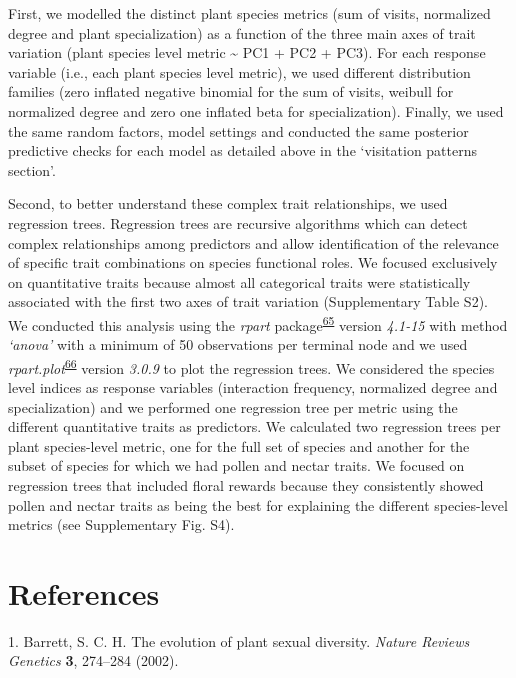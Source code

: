 \documentclass[12pt,a4paper,]{article}
\begin{document}
First, we modelled the distinct plant species metrics (sum of visits,
normalized degree and plant specialization) as a function of the three
main axes of trait variation (plant species level metric
\textasciitilde{} PC1 + PC2 + PC3). For each response variable (i.e.,
each plant species level metric), we used different distribution
families (zero inflated negative binomial for the sum of visits, weibull
for normalized degree and zero one inflated beta for specialization).
Finally, we used the same random factors, model settings and conducted
the same posterior predictive checks for each model as detailed above in
the `visitation patterns section'.

Second, to better understand these complex trait relationships, we used
regression trees. Regression trees are recursive algorithms which can
detect complex relationships among predictors and allow identification
of the relevance of specific trait combinations on species functional
roles. We focused exclusively on quantitative traits because almost all
categorical traits were statistically associated with the first two axes
of trait variation (Supplementary Table S2). We conducted this analysis
using the \emph{rpart}
package\textsuperscript{\protect\hyperlink{ref-therneau2015}{65}}
version \emph{4.1-15} with method \emph{`anova'} with a minimum of 50
observations per terminal node and we used
\emph{rpart.plot}\textsuperscript{\protect\hyperlink{ref-milborrow2015}{66}}
version \emph{3.0.9} to plot the regression trees. We considered the
species level indices as response variables (interaction frequency,
normalized degree and specialization) and we performed one regression
tree per metric using the different quantitative traits as predictors.
We calculated two regression trees per plant species-level metric, one
for the full set of species and another for the subset of species for
which we had pollen and nectar traits. We focused on regression trees
that included floral rewards because they consistently showed pollen and
nectar traits as being the best for explaining the different
species-level metrics (see Supplementary Fig. S4).

\section{References}\label{references}

\hypertarget{refs}{}
\hypertarget{ref-barrett2002}{}
1. Barrett, S. C. H. The evolution of plant sexual diversity.
\emph{Nature Reviews Genetics} \textbf{3}, 274--284 (2002).
\end{document}
